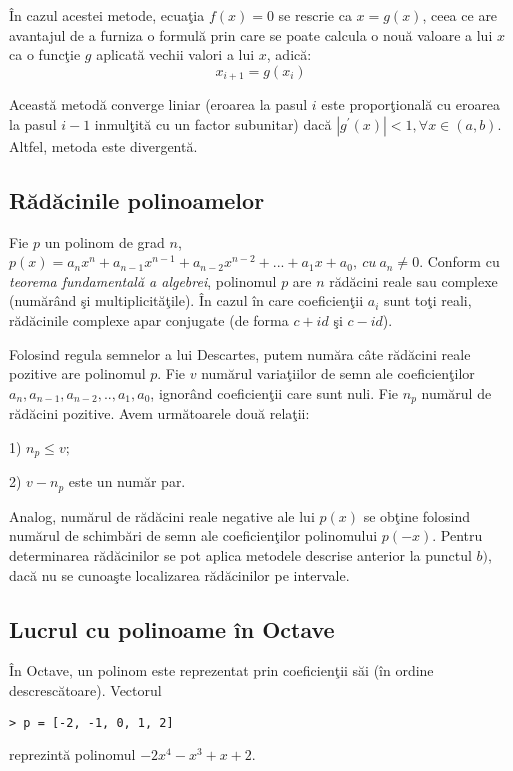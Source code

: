\documentclass{exam}
\begin{document}
În cazul acestei metode, ecuaţia $f(x)=0$ se rescrie ca $x=g(x)$, ceea ce are avantajul de a furniza o formulă prin care se poate calcula o nouă valoare a lui $x$ ca o funcţie $g$ aplicată vechii valori a lui $x$, adică:
$$x_{i+1}=g(x_{i})$$

Această metodă converge liniar (eroarea la pasul $i$ este proporţională cu eroarea la pasul $i-1$ inmulţită cu un factor subunitar) dacă $\left |g^{'}(x)  \right |<1,  \forall x\in (a,b)$. Altfel, metoda este divergentă.

\subsection{Rădăcinile polinoamelor}

Fie $p$ un polinom de grad $n$, $p(x)= a_{n}x^{n}+a_{n-1}x^{n-1}+a_{n-2}x^{n-2}+...+a_{1}x+a_{0}, \: cu \: a_{n}\neq 0$.
Conform cu \textit{teorema fundamentală a algebrei}, polinomul $p$ are $n$ rădăcini reale sau complexe (numărând şi multiplicităţile). În cazul în care coeficienţii $a_{i}$ sunt toţi reali,  rădăcinile complexe apar conjugate (de forma $c+id$ şi $c-id$).

Folosind regula semnelor a lui Descartes, putem număra câte rădăcini reale pozitive are polinomul $p$. Fie $v$ numărul variaţiilor de semn ale coeficienţilor $a_{n}, a_{n-1}, a_{n-2},.., a_{1},a_{0}$, ignorând coeficienţii care sunt nuli. Fie $n_{p}$ numărul de rădăcini pozitive. Avem următoarele două relaţii:

1) $n_{p}\leq v;$

2) $v-n_{p}$ este un număr par.

Analog, numărul de rădăcini reale negative ale lui $p(x)$ se obţine folosind numărul de schimbări de semn ale coeficienţilor polinomului  $p(-x)$.
Pentru determinarea rădăcinilor se pot aplica metodele descrise anterior la punctul $b)$, dacă nu se cunoaşte localizarea rădăcinilor pe intervale.


\subsection{Lucrul cu polinoame în Octave}

În Octave, un polinom este reprezentat prin coeficienţii săi (în ordine descrescătoare). Vectorul
\begin{verbatim}
> p = [-2, -1, 0, 1, 2]
\end{verbatim}

\noindent  reprezintă polinomul $-2x^{4}-x^{3}+x+2.$
\end{document}
